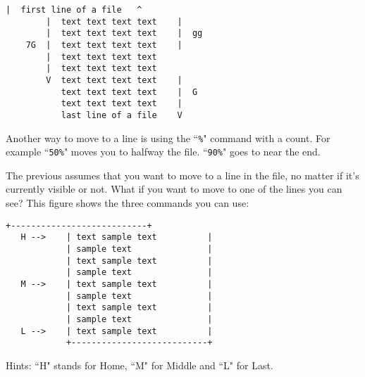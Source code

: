 \begin{Verbatim}[samepage=true]
        |  first line of a file   ^
        |  text text text text    |
        |  text text text text    |  gg
    7G  |  text text text text    |
        |  text text text text
        |  text text text text
        V  text text text text    |
           text text text text    |  G
           text text text text    |
           last line of a file    V
\end{Verbatim}

Another way to move to a line is using the ``\texttt{\%}" command with a count.
For example ``\texttt{50\%}" moves you to halfway the file.
``\texttt{90\%}" goes to near the end.

The previous assumes that you want to move to a line in the file, no matter if it's currently visible or not.
What if you want to move to one of the lines you can see?
This figure shows the three commands you can use:

\begin{Verbatim}[samepage=true]
            +---------------------------+
   H -->    | text sample text          |
            | sample text               |
            | text sample text          |
            | sample text               |
   M -->    | text sample text          |
            | sample text               |
            | text sample text          |
            | sample text               |
   L -->    | text sample text          |
            +---------------------------+
\end{Verbatim}

Hints: ``H" stands for Home, ``M" for Middle and ``L" for Last.

